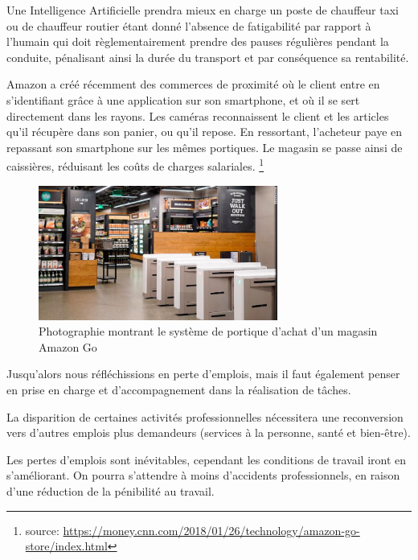     Une Intelligence Artificielle prendra mieux en charge un poste de chauffeur taxi ou de chauffeur routier
    étant donné l'absence de fatigabilité par rapport à l'humain qui doit règlementairement prendre des pauses régulières
    pendant la conduite, pénalisant ainsi la durée du transport et par conséquence sa rentabilité. \newline

    Amazon a créé récemment des commerces de proximité où le client entre en s'identifiant grâce à une application sur son smartphone,
    et où il se sert directement dans les rayons. Les caméras reconnaissent le client et les articles qu'il récupère dans son panier,
    ou qu'il repose. En ressortant, l'acheteur paye en repassant son smartphone sur les mêmes portiques.
    Le magasin se passe ainsi de caissières, réduisant les coûts de charges salariales.
    \footnote{source: \url{https://money.cnn.com/2018/01/26/technology/amazon-go-store/index.html}}
    \newline

    \begin{figure}[H]
        \centering
        \includegraphics[width=0.7\textwidth]{Images/amazongoinside}
        \caption{Photographie montrant le système de portique d'achat d'un magasin Amazon Go}
        \label{fig:explicability}
    \end{figure}

    Jusqu'alors nous réfléchissions en perte d'emplois, mais il faut également penser en prise en charge
    et d'accompagnement dans la réalisation de tâches. \newline

    La disparition de certaines activités professionnelles nécessitera une reconversion vers d'autres emplois plus demandeurs
    (services à la personne, santé et bien-être). \newline

    Les pertes d'emplois sont inévitables, cependant les conditions de travail iront en s'améliorant.
    On pourra s'attendre à moins d'accidents professionnels, en raison d'une réduction de la pénibilité au travail. \newline


